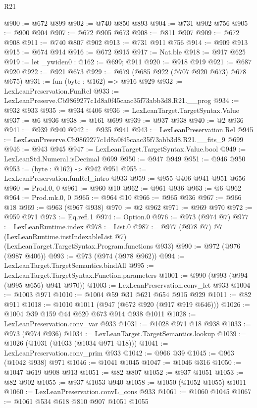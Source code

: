 \begin{lexlean}{R21}
\begin{coremodule}
@900 := @672 @899
@902 := @740 @850 @893
@904 := @731 @902 @756
@905 := @900 @904
@907 := @672 @905 @673
@908 := @811 @907
@909 := @672 @908
@911 := @740 @807 @902
@913 := @731 @911 @756
@914 := @909 @913
@915 := @674 @914
@916 := @672 @915
@917 := Nat.ble
@918 := @917 @625
@919 := let _ywiden0 : @162 := @699; @911
@920 := @918 @919
@921 := @687 @920
@922 := @921 @673
@929 := @679 (@685 @922 (@707 @920 @673) @678 @675)
@931 := fun (byte : @162) => @916 @929
@932 := LexLeanPreservation.FunRel
@933 := LexLeanPreserve.Cb9869277c1d8a0f45caac35f73abb3d8.R21.__prog
@934 := @932 @933
@935 := @934 @406
@936 := LexLeanTarget.TargetSyntax.Value
@937 := @6 @936
@938 := @161 @699
@939 := @937 @938
@940 := @2 @936
@941 := @939 @940
@942 := @935 @941
@943 := LexLeanPreservation.Rel
@945 := LexLeanPreserve.Cb9869277c1d8a0f45caac35f73abb3d8.R21.__fits_9 @699
@946 := @943 @945
@947 := LexLeanTarget.TargetSyntax.Value.bool
@949 := LexLeanStd.Numeral.isDecimal @699
@950 := @947 @949
@951 := @946 @950
@953 := (byte : @162) -> @942 @951
@955 := LexLeanPreservation.funRel_intro @933
@959 := @955 @406 @941 @951 @656
@960 := Prod.{0, 0}
@961 := @960 @10
@962 := @961 @936
@963 := @6 @962
@964 := Prod.mk.{0, 0}
@965 := @964 @10
@966 := @965 @936
@967 := @966 @18
@969 := @963 (@967 @938)
@970 := @2 @962
@971 := @969 @970
@972 := @959 @971
@973 := Eq.refl.{1}
@974 := Option.{0}
@976 := @973 (@974 @7)
@977 := LexLeanRuntime.index
@978 := List.{0}
@987 := @977
    (@978 @7)
    @7
    (LexLeanRuntime.instIndexableList @7)
    (LexLeanTarget.TargetSyntax.Program.functions @933)
@990 := @972 (@976 (@987 @406))
@993 := @973 (@974 (@978 @962))
@994 := LexLeanTarget.TargetSemantics.bindAll
@995 := LexLeanTarget.TargetSyntax.Function.parameters
@1001 := @990 (@993 (@994 (@995 @656) @941 @970))
@1003 := LexLeanPreservation.conv_let @933
@1004 := @1003 @971
@1010 := @1004 @59 @31 @621 @654 @915 @929
@1011 := @82 @911
@1018 := @1010 @1011 (@947 (@672 @920 (@917 @919 @646)))
@1026 := @1004 @39 @159 @44 @620 @673 @914 @938 @1011
@1028 := LexLeanPreservation.conv_var @933
@1031 := @1028 @971 @18 @938
@1033 := @973 (@974 @936)
@1034 := LexLeanTarget.TargetSemantics.lookup
@1039 := @1026 (@1031 (@1033 (@1034 @971 @18)))
@1041 := LexLeanPreservation.conv_prim @933
@1042 := @966 @39
@1045 := @963 (@1042 @938) @971
@1046 := @1041 @1045
@1047 := @1046 @316
@1050 := @1047 @619 @908 @913
@1051 := @82 @807
@1052 := @937 @1051
@1053 := @82 @902
@1055 := @937 @1053 @940
@1058 := @1050 (@1052 @1055) @1011
@1060 := LexLeanPreservation.convL_cons @933
@1061 := @1060 @1045
@1067 := @1061 @534 @618 @810 @907 @1051 @1055

\end{coremodule}
\end{lexlean}
